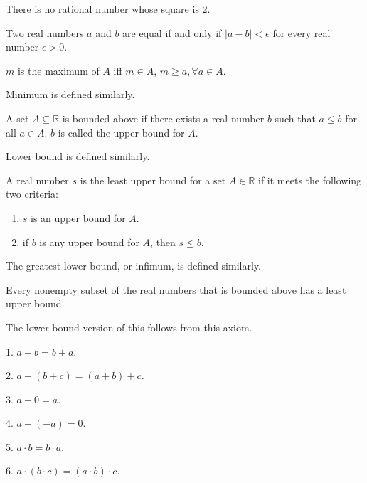 \documentclass{article}
\begin{document}

    There is no rational number whose square is 2.

\medskip
{}

    Two real numbers $a$ and $b$ are equal if and only if $|a-b| < \epsilon$ for every real number $\epsilon > 0$.

\medskip
{}
    
    $m$ is the maximum of $A$ iff $m \in A$, $m \geq a, \forall a\in A$.
    
    Minimum is defined similarly.

\medskip
{}
    
    A set $A \subseteq \mathbb R$ is bounded above if there exists a real number $b$ such that $a \leq b$ for all $a \in A$. $b$ is called the upper bound for $A$.
    
    Lower bound is defined similarly.

\medskip
{}

    A real number $s$ is the least upper bound for a set $A \in \mathbb R$ if it meets the following two criteria:
    \begin{enumerate}
        \item $s$ is an upper bound for $A$.
        \item if $b$ is any upper bound for $A$, then $s \leq b$.
    \end{enumerate}
    
    The greatest lower bound, or infimum, is defined similarly.

\medskip
{}

    Every nonempty subset of the real numbers that is bounded above has a least upper bound.
    
    The lower bound version of this follows from this axiom.

\medskip
{}

    1. $a + b = b + a$.
    
    2. $a + (b + c) = (a + b) + c$.
    
    3. $a + 0 = a$.

    4. $a + (-a) = 0$.

    5. $a \cdot b = b \cdot a$.
    
    6. $a \cdot (b \cdot c) = (a \cdot b) \cdot c$.
    
\end{document}
